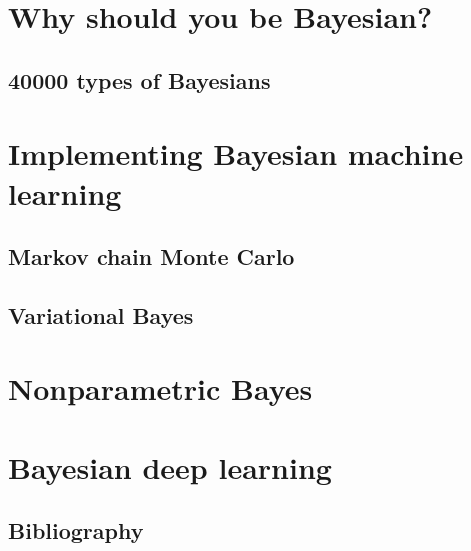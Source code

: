 \documentclass[11pt,fleqn]{book} %
\begin{document}
\part{Why should you be Bayesian?}
    \chapter{40000 types of Bayesians}
    

\part{Implementing Bayesian machine learning}
    \chapter{Markov chain Monte Carlo}
    
    \chapter{Variational Bayes}
    

\part{Nonparametric Bayes}
\part{Bayesian deep learning}

\chapter*{Bibliography}

\printbibliography[heading=bibempty]

\cleardoublepage %
\setlength{\columnsep}{0.75cm} %
\printindex %
\end{document}
